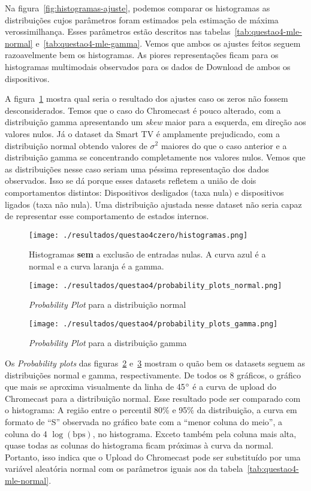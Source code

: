 \documentclass{article}
\begin{document}
Na figura~\ref{fig:histogramas-ajuste}, podemos comparar os histogramas as distribuições cujos parâmetros foram estimados pela estimação de máxima verossimilhança. Esses parâmetros estão descritos nas tabelas~\ref{tab:questao4-mle-normal} e~\ref{tab:questao4-mle-gamma}. Vemos que ambos os ajustes feitos seguem razoavelmente bem os histogramas. As piores representações ficam para os histogramas multimodais observados para os dados de Download de ambos os dispositivos.

A figura~\ref{fig:histogramas-ajuste-czero} mostra qual seria o resultado dos ajustes caso os zeros não fossem desconsiderados. Temos que o caso do Chromecast é pouco alterado, com a distribuição gamma apresentando um \textit{skew} maior para a esquerda, em direção aos valores nulos. Já o dataset da Smart TV é amplamente prejudicado, com a distribuição normal obtendo valores de $\sigma^2$ maiores do que o caso anterior e a distribuição gamma se concentrando completamente nos valores nulos. Vemos que as distribuições nesse caso seriam uma péssima representação dos dados observados. Isso se dá porque esses datasets refletem a união de dois comportamentos distintos: Dispositivos desligados (taxa nula) e dispositivos ligados (taxa não nula). Uma distribuição ajustada nesse dataset não seria capaz de representar esse comportamento de estados internos.

\begin{figure}[h]
	\centering
	\caption{Histogramas \textbf{sem} a exclusão de entradas nulas. A curva azul é a normal e a curva laranja é a gamma.}
	\texttt{[image: ./resultados/questao4czero/histogramas.png]}
	\label{fig:histogramas-ajuste-czero}
\end{figure}


\begin{figure}[h]
	\centering
	\caption{\textit{Probability Plot} para a distribuição normal}
	\texttt{[image: ./resultados/questao4/probability\_plots\_normal.png]}
	\label{fig:ppplot-normal}
\end{figure}

\begin{figure}[h]
	\centering
	\caption{\textit{Probability Plot} para a distribuição gamma}
	\texttt{[image: ./resultados/questao4/probability\_plots\_gamma.png]}
	\label{fig:ppplot-gamma}
\end{figure}

Os \textit{Probability plots} das figuras~\ref{fig:ppplot-normal} e~\ref{fig:ppplot-gamma} mostram o quão bem os datasets seguem as distribuições normal e gamma, respectivamente. De todos os 8 gráficos, o gráfico que mais se aproxima visualmente da linha de 45$\degree$ é a curva de upload do Chromecast para a distribuição normal. Esse resultado pode ser comparado com o histograma: A região entre o percentil 80\% e 95\% da distribuição, a curva em formato de ``S'' observada no gráfico bate com a ``menor coluna do meio'', a coluna do 4 $\log(\text{bps})$, no histograma. Exceto também pela coluna mais alta, quase todas as colunas do histograma ficam próximas à curva da normal. Portanto, isso indica que o Upload do Chromecast pode ser substituído por uma variável aleatória normal com os parâmetros iguais aos da tabela~\ref{tab:questao4-mle-normal}.
\end{document}
